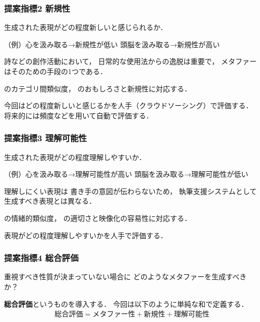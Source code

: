 \documentclass[12pt,usepdftitle=false]{beamer}
\begin{document}
\begin{frame}
    \frametitle{提案指標2 新規性}
    生成された表現がどの程度新しいと感じられるか．

    （例）心を汲み取る→新規性が低い\newline
     \phantom{（例）}\hspace{0.5\zw}頭脳を汲み取る→新規性が高い

    \bigskip

    詩などの創作活動において，
    日常的な使用法からの逸脱は重要で，
    メタファーはそのための手段の1つである\citep{leech2014}．

    \bigskip

    \citet{jakitada2001}のカテゴリ間類似度，
    \citet{abe2006}のおもしろさと新規性に対応する．

    \bigskip

%
%
%

    今回はどの程度新しいと感じるかを人手（クラウドソーシング）で評価する．
    将来的には頻度などを用いて自動で評価する．
\end{frame}

\begin{frame}
    \frametitle{提案指標3 理解可能性}
    生成された表現がどの程度理解しやすいか．

    （例）心を汲み取る→理解可能性が高い\newline
     \phantom{（例）}\hspace{0.5\zw}頭脳を汲み取る→理解可能性が低い

     \bigskip

     理解しにくい表現は
     書き手の意図が伝わらないため，
     執筆支援システムとして
     生成すべき表現とは異なる．

     \bigskip

    \citet{jakitada2001}の情緒的類似度，
    \citet{abe2006}の適切さと映像化の容易性に対応する．

    \bigskip

    表現がどの程度理解しやすいかを人手で評価する．

\end{frame}

\begin{frame}
    \frametitle{提案指標4 総合評価}

    重視すべき性質が決まっていない場合に
    どのようなメタファーを生成すべきか？

    \bigskip

    \textbf{総合評価}というものを導入する．
    今回は以下のように単純な和で定義する．
    \begin{align*}
        \text{総合評価}=\text{メタファー性}+\text{新規性}+\text{理解可能性}
    \end{align*}

\end{frame}
\end{document}
